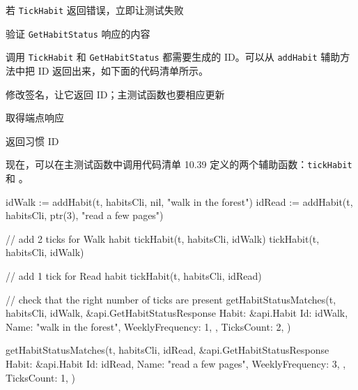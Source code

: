 \begin{codeannotations}
\item 若 \texttt{TickHabit} 返回错误，立即让测试失败
\item 验证 \texttt{GetHabitStatus} 响应的内容
\end{codeannotations}

调用 \texttt{TickHabit} 和 \texttt{GetHabitStatus} 都需要生成的 ID。可以从 \texttt{addHabit} 辅助方法中把 ID 返回出来，如下面的代码清单所示。


\begin{codeannotations}
\item 修改签名，让它返回 ID；主测试函数也要相应更新
\item 取得端点响应
\item 返回习惯 ID
\end{codeannotations}

现在，可以在主测试函数中调用代码清单 10.39 定义的两个辅助函数：\texttt{tickHabit} 和 。

\begin{gocode}[title={代码清单 10.41 \texttt{integration\_test.go}：打卡并核对状态}]
idWalk := addHabit(t, habitsCli, nil, "walk in the forest")
idRead := addHabit(t, habitsCli, ptr(3), "read a few pages")

// add 2 ticks for Walk habit
tickHabit(t, habitsCli, idWalk)
tickHabit(t, habitsCli, idWalk)

// add 1 tick for Read habit
tickHabit(t, habitsCli, idRead)

// check that the right number of ticks are present
getHabitStatusMatches(t, habitsCli, idWalk, &api.GetHabitStatusResponse{
    Habit: &api.Habit{
        Id:              idWalk,
        Name:            "walk in the forest",
        WeeklyFrequency: 1,
    },
    TicksCount: 2,
})

getHabitStatusMatches(t, habitsCli, idRead, &api.GetHabitStatusResponse{
    Habit: &api.Habit{
        Id:              idRead,
        Name:            "read a few pages",
        WeeklyFrequency: 3,
    },
    TicksCount: 1,
})
\end{gocode}

